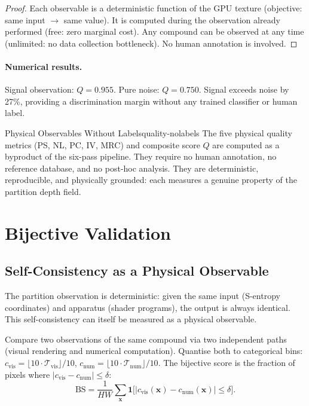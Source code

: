 \begin{proof}
  Each observable is a deterministic function of the GPU texture (objective:
  same input $\to$ same value).  It is computed during the observation
  already performed (free: zero marginal cost).  Any compound can be observed
  at any time (unlimited: no data collection bottleneck).  No human annotation
  is involved.
\end{proof}

\paragraph{Numerical results.}
Signal observation: $Q = 0.955$.  Pure noise: $Q = 0.750$.  Signal exceeds
noise by 27\%, providing a discrimination margin without any trained classifier
or human label.

\begin{consequence}{Physical Observables Without Labels}{quality-nolabels}
  The five physical quality metrics (PS, NL, PC, IV, MRC) and composite score
  $Q$ are computed as a byproduct of the six-pass pipeline.  They require no
  human annotation, no reference database, and no post-hoc analysis.
  They are deterministic, reproducible, and physically grounded: each measures
  a genuine property of the partition depth field.
\end{consequence}

\section{Bijective Validation}
\label{sec:ch22-bijective}

\subsection{Self-Consistency as a Physical Observable}

The partition observation is deterministic: given the same input (S-entropy
coordinates) and apparatus (shader programs), the output is always identical.
This self-consistency can itself be measured as a physical observable.

\begin{definition}
  Compare two observations of the same compound via two independent paths
  (visual rendering and numerical computation).  Quantise both to categorical
  bins: $c_{\mathrm{vis}} = \lfloor 10\cdot\mathcal{T}_{\mathrm{vis}}\rfloor/10$,
  $c_{\mathrm{num}} = \lfloor 10\cdot\mathcal{T}_{\mathrm{num}}\rfloor/10$.
  The bijective score is the fraction of pixels where
  $|c_{\mathrm{vis}} - c_{\mathrm{num}}|\leq\delta$:
  \begin{equation}
    \mathrm{BS} = \frac{1}{HW}\sum_{\mathbf{x}}
      \mathbf{1}\bigl[|c_{\mathrm{vis}}(\mathbf{x})
      - c_{\mathrm{num}}(\mathbf{x})|\leq\delta\bigr].
  \end{equation}
\end{definition}

